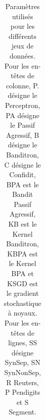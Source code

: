 \documentclass[twocolumn]{article}
\begin{document}
\begin{table}[h]
	\caption{Paramètres utilisés pour les différents jeux de données. Pour les en-têtes de colonne, P. désigne le Perceptron, PA désigne le Passif Agressif, B désigne le Banditron, C désigne le Confidit, BPA est le Bandit Passif Agressif, KB est le Kernel Banditron, KBPA est le Kernel BPA et KSGD est le gradient stochastique à noyaux. Pour les en-têtes de lignes, SS désigne SynSep, SN SynNonSep, R Reuters, P Pendigits et S Segment.}
	\label{table:bpa}
	\vspace{.3cm}
	\begin{small}
	
	
%			
%			
%			
%			
		\hspace{-.8cm}
		\begin{tabular}{llllll}
			

\end{tabular}
\end{small}
\end{table}
\end{document}
